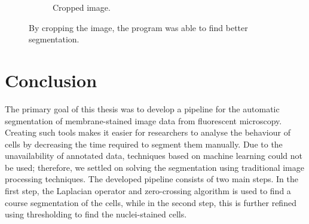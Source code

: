 \documentclass[
  digital,     %
  oneside,     %
  nosansbold,  %
  nocolorbold, %
  lof,         %
  lot,         %
]{fithesis4}
\begin{document}
\begin{figure}
\begin{subfigure}[t]{0.3\textwidth}
        \caption{Cropped image.}
    \end{subfigure}
    \caption{By cropping the image, the program was able to find better segmentation.}
    \label{fig:issues-cropping}
\end{figure}

\chapter{Conclusion}

The primary goal of this thesis was to develop a pipeline for the automatic segmentation of membrane-stained image data from fluorescent microscopy. Creating such tools makes it easier for researchers to analyse the behaviour of cells by decreasing the time required to segment them manually. Due to the unavailability of annotated data, techniques based on machine learning could not be used; therefore, we settled on solving the segmentation using traditional image processing techniques. The developed pipeline consists of two main steps. In the first step, the Laplacian operator and zero-crossing algorithm is used to find a course segmentation of the cells, while in the second step, this is further refined using thresholding to find the nuclei-stained cells.
\end{document}
